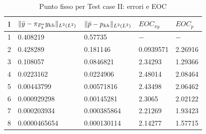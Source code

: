 \begin{table}
\caption{Punto fisso per Test case II: errori e EOC }
\label{puntofissoIIbis}
\centering

\begin{tabular}{cllll}
\toprule
{l}           &  {$ \lVert\bar{y}-\pi_{P^*_k}y_{kh}\rVert_{L^2(L^2)} $} &  {$ \lVert\bar{p}-p_{kh}\rVert_{L^2(L^2)} $} &  {$ EOC_{\pi y} $} &  {$ EOC_p $} \\
\midrule
1            &  0.408219 &  0.57735 &  {$-$} &  {$-$} \\
2            &  0.428289 &  0.181146 &  0.0939571 &  2.26916 \\
3            &  0.108057  &  0.0846821 &  2.34293 &  1.29366 \\
4            &  0.0223162  &  0.0224906 &  2.48014 &  2.08464 \\
5            &  0.00443799 &  0.00571816 &  2.43498 &  2.06462 \\
6            &  0.000929298 &  0.00145281 &  2.3065 &  2.02122 \\
7            &  0.000203934 &  0.000385864 &  2.21269 &  1.93423 \\      
8            &  0.0000465654 &  0.000130114 &  2.14277 &  1.57715 \\
\bottomrule
\end{tabular}              

\end{table}


